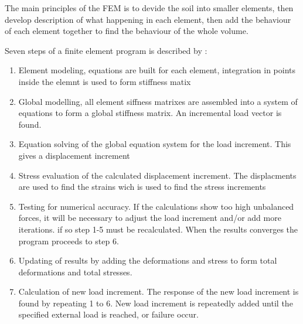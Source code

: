 The main principles of the FEM is to devide the soil into smaller elements, then develop description of what happening in each element, then add the behaviour of each element together to find the behaviour of the whole volume.

Seven steps of a finite element program is described by \citet{nordal2020compendium}:
\begin{enumerate}
	\item{Element modeling, equations are built for each element, integration in points inside the elemnt is used to form stiffness matix}
	\item{Global modelling, all element siffness matrixes are assembled into a system of equations to form a global stiffness matrix. An incremental load vector is found.}
	\item{Equation solving of the global equation system for the load increment. This gives a displacement increment}
	\item{Stress evaluation of the calculated displacement increment. The displacments are used to find the strains wich is used to find the stress increments}
	\item{Testing for numerical accuracy. If the calculations show too high unbalanced forces, it will be necessary to adjust the load increment and/or add more iterations. if so step 1-5 must be recalculated. When the results converges the program proceeds to step 6.}
	\item{Updating of results by adding the deformations and stress to form total deformations and total stresses.}
	\item{Calculation of new load increment. The response of the new load increment is found by repeating 1 to 6. New load increment is repeatedly added until the specified external load is reached, or failure occur.}
\end{enumerate}



